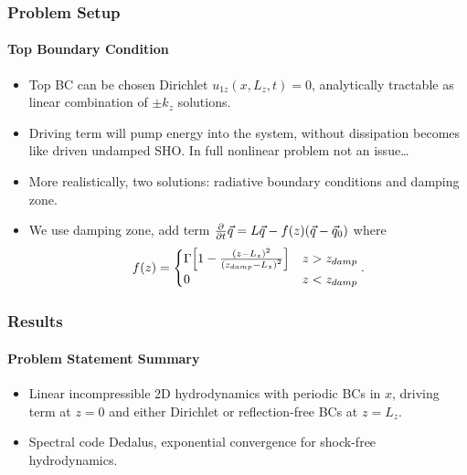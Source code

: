 \documentclass[dvipsnames]{beamer}
\newcommand*{\pd}[2]{\frac{\partial#1}{\partial#2}}
\DeclarePairedDelimiter\p{\lparen}{\rparen}
\DeclarePairedDelimiter\s{\lbrack}{\rbrack}
\begin{document}
\begin{frame}
    \frametitle{Problem Setup}
    \framesubtitle{Top Boundary Condition}

    \begin{itemize}
        \item Top BC can be chosen Dirichlet $u_{1z}(x, L_z, t) = 0$,
            analytically tractable as linear combination of $\pm k_z$ solutions.

        \item Driving term will pump energy into the system, without dissipation
            becomes like driven undamped SHO\@. In full nonlinear problem not an
            issue\dots

        \item More realistically, two solutions: radiative boundary conditions
            and damping zone.

        \item We use damping zone, add term $\pd{}{t}\vec{q} = L\vec{q}
            - f(z)\p*{\vec{q} - \vec{q}_0}$ where
            \begin{equation}
                f(z) =
                \begin{cases}
                    \Gamma \s*{
                        1 - \frac{\p*{z - L_z}^2}
                            {\p*{z_{damp} - L_z}^2}
                    }
                        & z > z_{damp}\\
                    0 & z < z_{damp}
                \end{cases}.
            \end{equation}
    \end{itemize}
\end{frame}

\begin{frame}
    \frametitle{Results}
    \framesubtitle{Problem Statement Summary}

    \begin{itemize}
        \item Linear incompressible 2D hydrodynamics with periodic BCs in $x$,
            driving term at $z = 0$ and either Dirichlet or reflection-free BCs
            at $z = L_z$.

        \item Spectral code Dedalus, exponential convergence for shock-free
            hydrodynamics.
    \end{itemize}
\end{frame}
\end{document}
